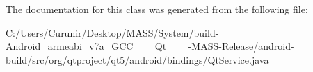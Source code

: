 The documentation for this class was generated from the following file\+:\begin{DoxyCompactItemize}
\item 
C\+:/\+Users/\+Curunir/\+Desktop/\+M\+A\+S\+S/\+System/build-\/\+Android\+\_\+armeabi\+\_\+v7a\+\_\+\+G\+C\+C\+\_\+\_\+\_\+\+Qt\+\_\+\_\+\_-\/\+M\+A\+S\+S-\/\+Release/android-\/build/src/org/qtproject/qt5/android/bindings/Qt\+Service.\+java\end{DoxyCompactItemize}
